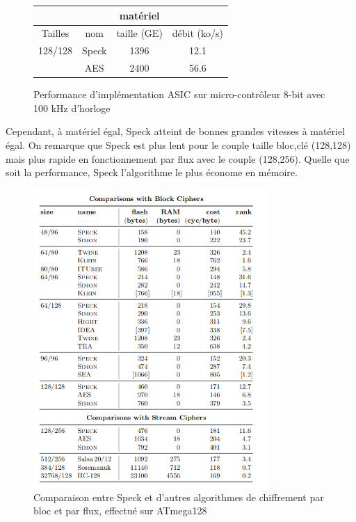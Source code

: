 \begin{figure}[H]
	\centering
	\bgroup
	\def\arraystretch{1.2}
	\begin{tabular}{cc|cc}
		        &       & \textbf{matériel} &              \\
		\hline
		Tailles & nom   & taille (GE)       & débit (ko/s) \\
		\hline
		128/128 & Speck & 1396              & 12.1         \\
		\hline
		        & AES   & 2400              & 56.6         \\
	\end{tabular}
	\egroup
	\caption{Performance d'implémentation ASIC sur micro-contrôleur 8-bit avec 100 kHz d'horloge \cite{speck_iot}}
	\label{tailleSpeck}
\end{figure}

Cependant, à matériel égal, Speck atteint de bonnes grandes vitesses à matériel
égal. On remarque que Speck est plus lent pour le couple taille bloc,clé
(128,128) mais plus rapide en fonctionnement par flux avec le couple (128,256).
Quelle que soit la performance, Speck l'algorithme le plus économe en mémoire.


\begin{figure}[H]
	\centering
	\includegraphics[width=0.8\textwidth]{imgs/perfSpeck.png}
	\caption{Comparaison entre Speck et d'autres algorithmes de chiffrement par bloc et par flux, effectué sur ATmega128 \cite{speck_micro}}
	\label{perfSpeck}
\end{figure}

